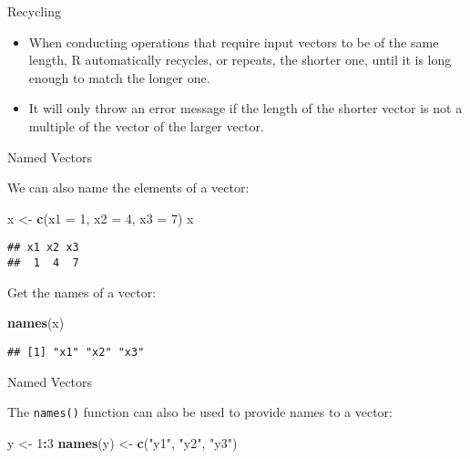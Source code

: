\documentclass[ignorenonframetext,]{beamer}
\newenvironment{Shaded}{\begin{snugshade}}{\end{snugshade}}
\newcommand{\DataTypeTok}[1]{\textcolor[rgb]{0.13,0.29,0.53}{#1}}
\newcommand{\DecValTok}[1]{\textcolor[rgb]{0.00,0.00,0.81}{#1}}
\newcommand{\KeywordTok}[1]{\textcolor[rgb]{0.13,0.29,0.53}{\textbf{#1}}}
\newcommand{\NormalTok}[1]{#1}
\newcommand{\OperatorTok}[1]{\textcolor[rgb]{0.81,0.36,0.00}{\textbf{#1}}}
\newcommand{\StringTok}[1]{\textcolor[rgb]{0.31,0.60,0.02}{#1}}
\begin{document}
\begin{frame}{Recycling}
\protect\hypertarget{recycling-2}{}

\begin{itemize}
\item
  When conducting operations that require input vectors to be of the
  same length, R automatically recycles, or repeats, the shorter one,
  until it is long enough to match the longer one.
\item
  It will only throw an error message if the length of the shorter
  vector is not a multiple of the vector of the larger vector.
\end{itemize}

\end{frame}

\begin{frame}[fragile]{Named Vectors}
\protect\hypertarget{named-vectors}{}

We can also name the elements of a vector:

\begin{Shaded}
\begin{Highlighting}[]
\NormalTok{x <-}\StringTok{ }\KeywordTok{c}\NormalTok{(}\DataTypeTok{x1 =} \DecValTok{1}\NormalTok{, }\DataTypeTok{x2 =}  \DecValTok{4}\NormalTok{, }\DataTypeTok{x3 =} \DecValTok{7}\NormalTok{)}
\NormalTok{x}
\end{Highlighting}
\end{Shaded}

\begin{verbatim}
## x1 x2 x3 
##  1  4  7
\end{verbatim}

Get the names of a vector:

\begin{Shaded}
\begin{Highlighting}[]
\KeywordTok{names}\NormalTok{(x)}
\end{Highlighting}
\end{Shaded}

\begin{verbatim}
## [1] "x1" "x2" "x3"
\end{verbatim}

\end{frame}

\begin{frame}[fragile]{Named Vectors}
\protect\hypertarget{named-vectors-1}{}

The \texttt{names()} function can also be used to provide names to a
vector:

\begin{Shaded}
\begin{Highlighting}[]
\NormalTok{y <-}\StringTok{ }\DecValTok{1}\OperatorTok{:}\DecValTok{3}
\KeywordTok{names}\NormalTok{(y) <-}\StringTok{ }\KeywordTok{c}\NormalTok{(}\StringTok{"y1"}\NormalTok{, }\StringTok{"y2"}\NormalTok{, }\StringTok{"y3"}\NormalTok{)}
\end{Highlighting}
\end{Shaded}

\end{frame}
\end{document}
